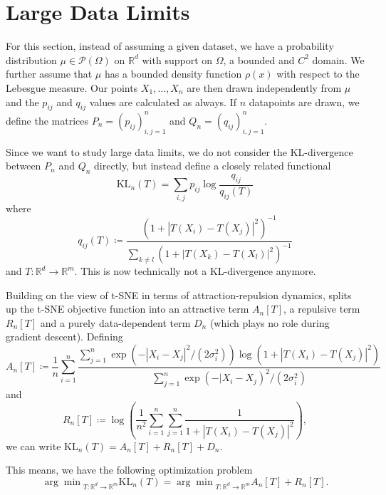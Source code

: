 \section{Large Data Limits}
For this section, instead of assuming a given dataset, we have a probability distribution $\mu \in \mathcal{P}(\Omega)$ on $\mathbb{R}^d$ with support on $\Omega$, a bounded and $C^2$ domain. 
We further assume that $\mu$ has a bounded density function $\rho(x)$ with respect to the Lebesgue measure. 
Our points $X_1, \dots, X_n$ are then drawn independently from $\mu$ and the $p_{ij}$ and $q_{ij}$ values are calculated as always. 
If $n$ datapoints are drawn, we define the matrices $P_n = (p_{ij})_{i,j=1}^n$ and $Q_n = (q_{ij})_{i,j=1}^n$. 

Since we want to study large data limits, we do not consider the KL-divergence between $P_n$ and $Q_n$ directly, but instead define a closely related functional 
\begin{equation}
    \text{KL}_n (T) = \sum_{i,j} p_{ij} \log \frac{q_{ij}}{q_{ij}(T)}
\end{equation}
where 
\begin{equation}
    q_{ij}(T) \coloneq \frac{(1+ |T(X_i) - T(X_j)|^2)^{-1}}{\sum_{k \neq l} (1+ |T(X_k) - T(X_l)|^2)^{-1}}
\end{equation}
and $T: \mathbb{R}^d \to \mathbb{R}^m$. This is now technically not a KL-divergence anymore. 

Building on the view of t-SNE in terms of attraction-repulsion dynamics, \cite{murray2024largedatalimitsscaling} splits up the t-SNE objective function into an attractive term $A_n[T]$, a repulsive term $R_n[T]$ and a purely data-dependent term  $D_n$ (which plays no role during gradient descent). Defining 
\begin{equation}
    A_n[T] \coloneq \frac{1}{n} \sum_{i=1}^n \frac{\sum_{j=1}^n \exp(-|X_i - X_j|^2/(2\sigma_i^2)) \log(1+ |T(X_i) - T(X_j)|^2)}{\sum_{j=1}^n \exp(-|X_i - X_j)^2 / (2\sigma_i^2)}
\end{equation}
and 
\begin{equation}
    R_n[T] \coloneq \log \left( \frac{1}{n^2} \sum_{i=1}^n \sum_{j=1}^n \frac{1}{1+ |T(X_i) - T(X_j)|^2} \right), 
\end{equation}
we can write $\text{KL}_n (T) = A_n[T] + R_n[T] + D_n$. 

This means, we have the following optimization problem
\begin{equation}
    {\arg \min}_{T: \mathbb{R}^d \to \mathbb{R}^m} \text{KL}_n (T) = {\arg \min}_{T: \mathbb{R}^d \to \mathbb{R}^m} A_n[T] + R_n[T].
\end{equation}

